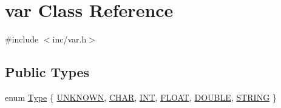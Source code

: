 \hypertarget{classvar}{}\section{var Class Reference}
\label{classvar}


{\ttfamily \#include $<$inc/var.\+h$>$}

\subsection*{Public Types}
\begin{DoxyCompactItemize}
\item 
enum \hyperlink{classvar_ae4f9e2c747c3e72f245b148146b1855e}{Type} \{ \newline
\hyperlink{classvar_ae4f9e2c747c3e72f245b148146b1855ea0f04795086058cdfd618ce292cc10f7b}{U\+N\+K\+N\+O\+WN}, 
\hyperlink{classvar_ae4f9e2c747c3e72f245b148146b1855eae9bfb9b218ebe0917ff49ad2dc74eea8}{C\+H\+AR}, 
\hyperlink{classvar_ae4f9e2c747c3e72f245b148146b1855eae8b4ab776b56b78d2f219c9666e6ffbf}{I\+NT}, 
\hyperlink{classvar_ae4f9e2c747c3e72f245b148146b1855ead10e07906d918cec495207e33b00256a}{F\+L\+O\+AT}, 
\newline
\hyperlink{classvar_ae4f9e2c747c3e72f245b148146b1855ea645fb8aa32f88e2b580ab65fe3a0a234}{D\+O\+U\+B\+LE}, 
\hyperlink{classvar_ae4f9e2c747c3e72f245b148146b1855ea7a154d7312f6d12c9031819ad3dfef71}{S\+T\+R\+I\+NG}
 \}
\end{DoxyCompactItemize}
